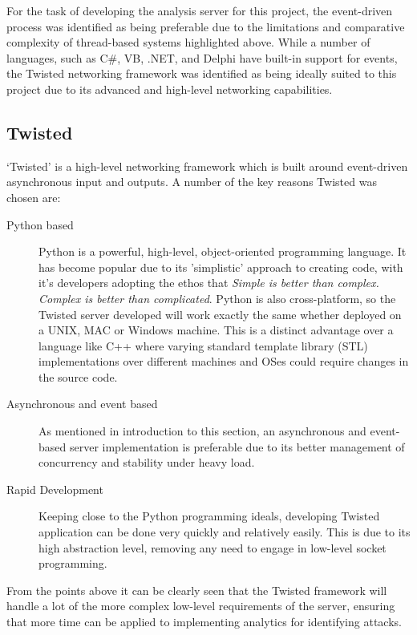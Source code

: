     \bigskip
    For the task of developing the analysis server for this project, the event-driven process was identified as being preferable due to the limitations and comparative complexity of thread-based systems highlighted above. While a number of languages, such as C\#, VB, .NET, and Delphi have built-in support for events, the Twisted networking framework was identified as being ideally suited to this project due to its advanced and high-level networking capabilities.

    \subsection{Twisted}
    \label{sec:twisted}
    `Twisted' is a high-level networking framework which is built around event-driven asynchronous input and outputs\cite{lefkowitz-network}. A number of the key reasons Twisted was chosen are\cite{fettig2005twisted}:

    \begin{description}
     \item[Python based] Python is a powerful, high-level, object-oriented programming language. It has become popular due to its 'simplistic' approach to creating code, with it's developers adopting the ethos that \textit{Simple is better than complex. Complex is better than complicated}\cite{TP}. Python is also cross-platform, so the Twisted server developed will work exactly the same whether deployed on a UNIX, MAC or Windows machine. This is a distinct advantage over a language like C++ where varying standard template library (STL) implementations over different machines and OSes could require changes in the source code.
     \item[Asynchronous and event based] As mentioned in introduction to this section, an asynchronous and event-based server implementation is preferable due to its better management of concurrency and stability under heavy load.
     \item[Rapid Development] Keeping close to the Python programming ideals, developing Twisted application can be done very quickly and relatively easily. This is due to its high abstraction level, removing any need to engage in low-level socket programming.
    \end{description}

    From the points above it can be clearly seen that the Twisted framework will handle a lot of the more complex low-level requirements of the server, ensuring that more time can be applied to implementing analytics for identifying attacks.

